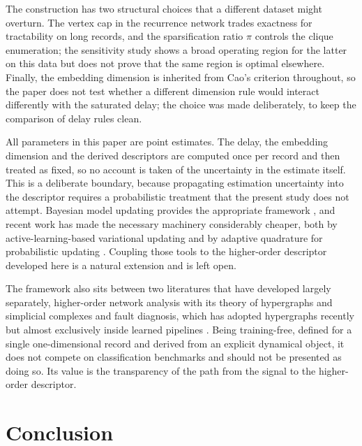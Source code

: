 \documentclass[10pt,a4paper,twocolumn]{article}
\begin{document}
The construction has two structural choices that a different dataset might
overturn.  The vertex cap in the recurrence network trades exactness for
tractability on long records, and the sparsification ratio $\pi$ controls the
clique enumeration; the sensitivity study shows a broad operating region for
the latter on this data but does not prove that the same region is optimal
elsewhere.  Finally, the embedding dimension is inherited from Cao's
criterion throughout, so the paper does not test whether a different
dimension rule would interact differently with the saturated delay; the
choice was made deliberately, to keep the comparison of delay rules clean.

All parameters in this paper are point estimates.  The delay, the embedding
dimension and the derived descriptors are computed once per record and then
treated as fixed, so no account is taken of the uncertainty in the estimate
itself.  This is a deliberate boundary, because propagating estimation
uncertainty into the descriptor requires a probabilistic treatment that the
present study does not attempt.  Bayesian model updating provides the
appropriate framework \citep{beck1998,kennedy2001}, and recent work has made
the necessary machinery considerably cheaper, both by active-learning-based
variational updating \citep{fangqi2025} and by adaptive quadrature for
probabilistic updating \citep{jingwen2025}.  Coupling those tools to the
higher-order descriptor developed here is a natural extension and is left
open.

The framework also sits between two literatures that have developed largely
separately, higher-order network analysis with its theory of hypergraphs and
simplicial complexes \citep{battiston2020,battiston2021,benson2016,
courtney2016,iacopini2019} and fault diagnosis, which has adopted hypergraphs
recently but almost exclusively inside learned pipelines
\citep{yan2022,yan2024,shi2023,su2023}.  Being training-free, defined for a
single one-dimensional record and derived from an explicit dynamical object,
it does not compete on classification benchmarks and should not be presented
as doing so.  Its value is the transparency of the path from the signal to the
higher-order descriptor.

\section{Conclusion}
\label{sec:concl}
\end{document}
